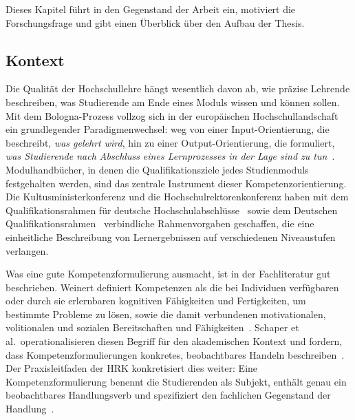 
Dieses Kapitel führt in den Gegenstand der Arbeit ein, motiviert die Forschungsfrage und gibt einen Überblick über den Aufbau der Thesis.

\subsection{Kontext}\label{sec:kontext}

Die Qualität der Hochschullehre hängt wesentlich davon ab, wie präzise Lehrende beschreiben, was Studierende am Ende eines Moduls wissen und können sollen.
Mit dem Bologna-Prozess vollzog sich in der europäischen Hochschullandschaft ein grundlegender Paradigmenwechsel: weg von einer Input-Orientierung, die beschreibt, \emph{was gelehrt wird}, hin zu einer Output-Orientierung, die formuliert, \emph{was Studierende nach Abschluss eines Lernprozesses in der Lage sind zu tun}~\cite{hrknexus2015lernergebnisse}.
Modulhandbücher, in denen die Qualifikationsziele jedes Studienmoduls festgehalten werden, sind das zentrale Instrument dieser Kompetenzorientierung.
Die Kultusministerkonferenz und die Hochschulrektorenkonferenz haben mit dem Qualifikationsrahmen für deutsche Hochschulabschlüsse~\cite{kmk2017qualifikationsrahmen} sowie dem Deutschen Qualifikationsrahmen~\cite{dqr2013handbuch} verbindliche Rahmenvorgaben geschaffen, die eine einheitliche Beschreibung von Lernergebnissen auf verschiedenen Niveaustufen verlangen.

Was eine gute Kompetenzformulierung ausmacht, ist in der Fachliteratur gut beschrieben.
Weinert definiert Kompetenzen als \glqq die bei Individuen verfügbaren oder durch sie erlernbaren kognitiven Fähigkeiten und Fertigkeiten, um bestimmte Probleme zu lösen, sowie die damit verbundenen motivationalen, volitionalen und sozialen Bereitschaften und Fähigkeiten\grqq~\cite{weinert2001leistungsmessung}.
Schaper et al.\ operationalisieren diesen Begriff für den akademischen Kontext und fordern, dass Kompetenzformulierungen konkretes, beobachtbares Handeln beschreiben~\cite{schaper2012fachgutachten}.
Der Praxisleitfaden der HRK konkretisiert dies weiter: Eine Kompetenzformulierung benennt die Studierenden als Subjekt, enthält genau ein beobachtbares Handlungsverb und spezifiziert den fachlichen Gegenstand der Handlung~\cite{hrknexus2015lernergebnisse}.

